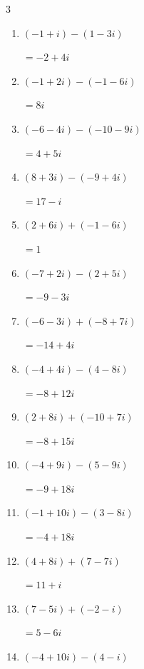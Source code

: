 \begin{multicols}{3}
\begin{enumerate}
\resetques

  \item $\displaystyle (-1+i) - (1-3i)$

        $\displaystyle =-2+4i$

  \item $\displaystyle (-1+2i) - (-1-6i)$

        $\displaystyle =8i$

  \item $\displaystyle (-6-4i) - (-10-9i)$

        $\displaystyle =4+5i$

  \item $\displaystyle (8+3i) - (-9+4i)$

        $\displaystyle =17-i$

  \item $\displaystyle (2+6i) + (-1-6i)$

        $\displaystyle =1$

  \item $\displaystyle (-7+2i) - (2+5i)$

        $\displaystyle =-9-3i$

  \item $\displaystyle (-6-3i) + (-8+7i)$

        $\displaystyle =-14+4i$

  \item $\displaystyle (-4+4i) - (4-8i)$

        $\displaystyle =-8+12i$

  \item $\displaystyle (2+8i) + (-10+7i)$

        $\displaystyle =-8+15i$

  \item $\displaystyle (-4+9i) - (5-9i)$

        $\displaystyle =-9+18i$

  \item $\displaystyle (-1+10i) - (3-8i)$

        $\displaystyle =-4+18i$

  \item $\displaystyle (4+8i) + (7-7i)$

        $\displaystyle =11+i$

  \item $\displaystyle (7-5i) + (-2-i)$

        $\displaystyle =5-6i$

  \item $\displaystyle (-4+10i) - (4-i)$


\end{enumerate}
\end{multicols}

